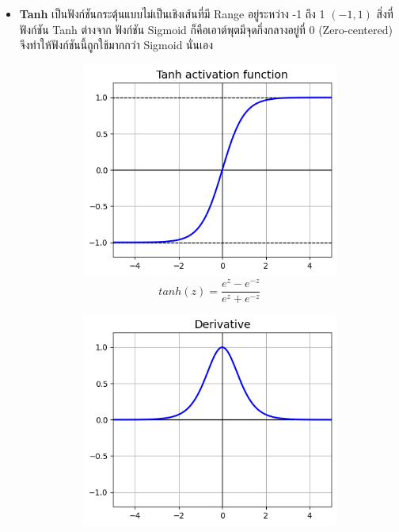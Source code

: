 \begin{itemize}
    \item \textbf{Tanh} เป็นฟังก์ชันกระตุ้นแบบไม่เป็นเชิงเส้นที่มี Range อยู่ระหว่าง -1 ถึง 1 $(-1, 1)$ สิ่งที่ฟังก์ชัน Tanh ต่างจาก%
    ฟังก์ชัน Sigmoid ก็คือเอาต์พุตมีจุดกึ่งกลางอยู่ที่ 0 (Zero-centered) จึงทำให้ฟังก์ชันนี้ถูกใช้มากกว่า Sigmoid นั่นเอง
    \begin{figure}[H]
        \centering
        \begin{subfigure}{0.5\textwidth}
            \centering
            \includegraphics[width=0.9\linewidth]{fig/actfunc_tanh.png}
            \caption{%
                \begin{equation}
                    tanh(z) = \frac{e^{z} - e^{-z}}{e^{z} + e^{-z}}
                \end{equation}
            }
            \label{fig:actfunc_tanh}
        \end{subfigure}%
        \begin{subfigure}{0.5\textwidth}
            \centering
            \includegraphics[width=0.9\linewidth]{fig/actfunc_tanh_der.png}

\end{subfigure}
\end{figure}
\end{itemize}
